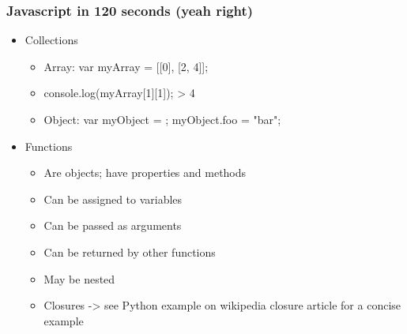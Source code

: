 \documentclass{beamer}
\begin{document}
\begin{frame}
    \frametitle{Javascript in 120 seconds (yeah right)}
    \begin{itemize}
    \item Collections
        \begin{itemize}
        \item Array: var myArray = [[0], [2, 4]]; 
        \item console.log(myArray[1][1]); > 4
        \item Object: var myObject = {}; myObject.foo = "bar";
        \end{itemize}
    \item Functions
        \begin{itemize}
        \item Are objects; have properties and methods
        \item Can be assigned to variables
        \item Can be passed as arguments
        \item Can be returned by other functions
        \item May be nested
        \item Closures -> see Python example on wikipedia closure article for a concise example
        \end{itemize}
    \end{itemize}
\end{frame}

\end{document}
